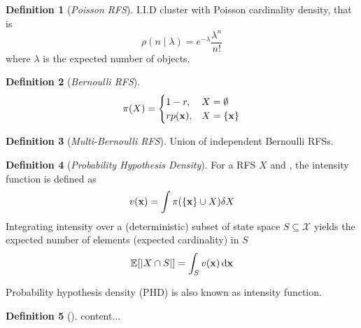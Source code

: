 \documentclass[a4paper,10pt]{scrreprt}
\theoremstyle{theorem}
\theoremstyle{definition}
\newtheorem{defn}{Definition}
\begin{document}
\begin{defn}[\emph{Poisson RFS}]
	I.I.D cluster with Poisson cardinality density, that is
	\begin{equation}\label{key}
		\rho(n \mid \lambda) = e^{-\lambda} \frac{\lambda^n}{n!}
	\end{equation}
	where \( \lambda \) is the expected number of objects.
\end{defn}

\begin{defn}[\emph{Bernoulli RFS}]
\begin{equation}\label{eq:bernoulli_rfs}
	\pi(X) = 
	\begin{cases}
	1 - r, 			& X = \emptyset \\
	r p(\stVar), 	& X = \Bqty{\stVar}
	\end{cases}
\end{equation}
\end{defn}

\begin{defn}[\emph{Multi-Bernoulli RFS}]
	Union of independent Bernoulli RFSs.
\end{defn}

\begin{defn}[\emph{Probability Hypothesis Density}]
	For a RFS \( X \) and , the intensity function is defined as
	\begin{equation}\label{key}
		v(\stVar) = \int \pi(\Bqty{\stVar} \cup X) \dsx[X]
	\end{equation}
	Integrating intensity over a (deterministic) subset of state space \( S \subseteq \mathcal{X} \) yields the expected number of elements (expected cardinality) in \( S \)
	\begin{equation}\label{key}
		\E{|X \cap S|} = \int_S v(\stVar) \dx[\stVar]
	\end{equation}
\end{defn}
Probability hypothesis density (PHD) is also known as intensity function.

\begin{defn}[]
	content...
\end{defn}
\end{document}
